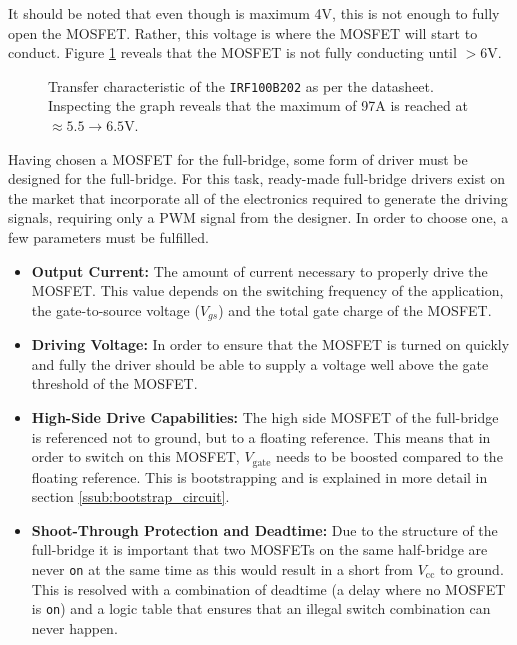 It should be noted that even though \vth is maximum 4V, this is not enough to fully open the MOSFET.
Rather, this voltage is where the MOSFET will start to conduct.
Figure \ref{fig:mosfettransfercharacteristic} reveals that the MOSFET is not fully conducting until \vgs $>6$V.

\begin{figure}[H]
	\centering
	\caption[Transfer characteristic of the IRF100B202.]{Transfer characteristic of the \texttt{IRF100B202} as per the datasheet.
	Inspecting the graph reveals that the maximum \id of 97A is reached at \vgs$\approx5.5\rightarrow6.5$V.}
	\label{fig:mosfettransfercharacteristic}
\end{figure}
 
Having chosen a MOSFET for the full-bridge, some form of driver must be designed for the full-bridge.
For this task, ready-made full-bridge drivers exist on the market that incorporate all of the electronics required to generate the driving signals, requiring only a PWM signal from the designer.
In order to choose one, a few parameters must be fulfilled.

\begin{itemize}
	\item \textbf{Output Current:} The amount of current necessary to properly drive the MOSFET.
	This value depends on the switching frequency of the application, the gate-to-source voltage ($V_{gs}$) and the total gate charge of the MOSFET.
	\item \textbf{Driving Voltage:} In order to ensure that the MOSFET is turned on quickly and fully the driver should be able to supply a voltage well above the gate threshold of the MOSFET.
	\item \textbf{High-Side Drive Capabilities:} The high side MOSFET of the full-bridge is referenced not to ground, but to a floating reference.
	This means that in order to switch on this MOSFET, $V_{\text{gate}}$ needs to be boosted compared to the floating reference. 
	This is bootstrapping and is explained in more detail in section \ref{ssub:bootstrap_circuit}.
	\item \textbf{Shoot-Through Protection and Deadtime:} Due to the structure of the full-bridge it is important that two MOSFETs on the same half-bridge are never \texttt{on} at the same time as this would result in a short from $V_{\text{cc}}$ to ground.
	This is resolved with a combination of deadtime (a delay where no MOSFET is \texttt{on}) and a logic table that ensures that an illegal switch combination can never happen.
\end{itemize}

